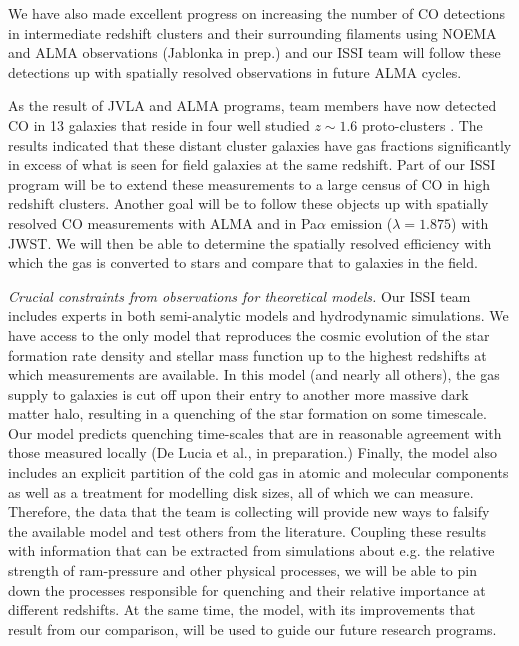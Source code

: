 \documentclass[11pt]{article}
\begin{document}
We have also made excellent progress on increasing the number of CO detections in intermediate redshift clusters and their surrounding filaments using NOEMA \citep{Jablonka13} and ALMA observations (Jablonka in prep.) and our ISSI team will follow these detections up with spatially resolved observations in future ALMA cycles.  

As the result of JVLA and ALMA programs, team members have now detected CO
in 13 galaxies that reside in four well studied $z\sim 1.6$ proto-clusters
\citep{Rudnick17b,Noble17}.  The results indicated that these distant cluster galaxies have gas fractions significantly in excess of what is seen for field galaxies at the same redshift.  Part of our ISSI program will be to extend these measurements to a large census of CO in high redshift clusters.  Another goal will be to follow these objects up with spatially resolved CO measurements with ALMA and in Pa$\alpha$ emission ($\lambda=1.875$\micron) with JWST.  We will then be able to determine the spatially resolved efficiency with which the gas is converted to stars and compare that to galaxies in the field.


\textit{Crucial constraints from observations for theoretical models.} Our ISSI team includes experts in both semi-analytic models and hydrodynamic simulations.  We have access to the only model that reproduces the cosmic evolution of the star formation rate density and stellar mass function up to the highest redshifts at which measurements are available.  In this model (and nearly all others), the gas supply to galaxies is cut off upon their entry to another more massive dark matter halo, resulting in a quenching of the star formation on some timescale.  Our model predicts quenching time-scales that are in reasonable agreement with  those measured locally (De Lucia et al., in preparation.)  Finally, the model also includes
an explicit partition of the cold gas in atomic and molecular components as
well as a treatment for modelling disk sizes, all of which we can measure. Therefore, the data that  the team is
collecting  will  provide new ways to falsify the available model and test others from the literature. Coupling
these results with information that can be extracted from simulations about
e.g. the relative strength of ram-pressure and other physical processes, we
will be able to pin down the processes responsible for quenching and their
relative importance  at  different  redshifts. At the  same time, the model, with its improvements that result from our comparison, will be used to guide our future research programs.
\end{document}
